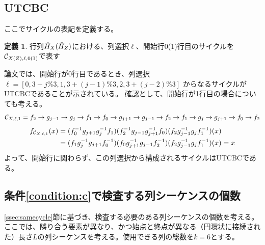 \documentclass[a4paper,11pt,dvipdfmx]{jsarticle}
\theoremstyle{definition}
\newtheorem{definition}{定義}[section]
\begin{document}
\subsection{UTCBC}
ここでサイクルの表記を定義する。
\begin{definition}
  行列$\hat{H}_X(\hat{H}_Z)$における、列選択$\ell$、開始行0(1)行目のサイクルを
  $\mathcal{C}_{{X(Z)},{\ell},{0(1)}}$で表す
\end{definition}
論文では、開始行が0行目であるとき、列選択
$\ell = [0,3+j\%3,1,3+(j-1)\%3,2,3+(j-2)\%3]$
からなるサイクルがUTCBCであることが示されている。
確認として、開始行が1行目の場合についても考える。
\begin{align}
  \mathcal{C}_{{X},{\ell},{1}} = 
  f_2
  \rightarrow g_{j-1}
  \rightarrow g_{j}
  \rightarrow f_1
  \rightarrow f_0
  \rightarrow g_{j+1}
  \rightarrow g_{j-1}
  \rightarrow f_2
  \rightarrow f_1
  \rightarrow g_j
  \rightarrow g_{j+1}
  \rightarrow f_0
  \rightarrow f_2
\end{align}
\begin{align}
  f_{\mathcal{C}_{{X},{\ell},{1}}}(x) &= 
  (
    f_0^{-1}
    g_{j+1}
    g_j^{-1}
    f_1
  )
  (
    f_2^{-1}
    g_{j-1}
    g_{j+1}^{-1}
    f_0
  )
  (
    f_2
    g_{j-1}^{-1}
    g_j
    f_1^{-1}
    )(x)\\
  &=
  (
    f_1
    g_j^{-1}
    g_{j+1}
    f_0^{-1}
  )
  (
    f_0
    g_{j+1}^{-1}
    g_{j-1}
    f_2^{-1}
  )
  (
    f_2
    g_{j-1}^{-1}
    g_j
    f_1^{-1}
  )(x)=x
\end{align}
よって、開始行に関わらず、この列選択から構成されるサイクルはUTCBCである。

\subsection{条件\ref{condition:c}で検査する列シーケンスの個数}
\ref{ssec:samecycle}節に基づき、検査する必要のある列シーケンスの個数を考える。
ここでは、隣り合う要素が異なり、かつ始点と終点が異なる（円環状に接続された）長さ$L$の列シーケンスを考える。使用できる列の総数を$k=6$とする。
\end{document}
